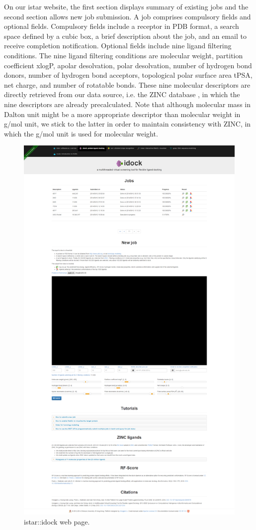 On our istar website, the first section displays summary of existing jobs and the second section allows new job submission. A job comprises compulsory fields and optional fields. Compulsory fields include a receptor in PDB format, a search space defined by a cubic box, a brief description about the job, and an email to receive completion notification. Optional fields include nine ligand filtering conditions. The nine ligand filtering conditions are molecular weight, partition coefficient xlogP, apolar desolvation, polar desolvation, number of hydrogen bond donors, number of hydrogen bond acceptors, topological polar surface area tPSA, net charge, and number of rotatable bonds. These nine molecular descriptors are directly retrieved from our data source, i.e. the ZINC database \citep{532,1178}, in which the nine descriptors are already precalculated. Note that although molecular mass in Dalton unit might be a more appropriate descriptor than molecular weight in g/mol unit, we stick to the latter in order to maintain consistency with ZINC, in which the g/mol unit is used for molecular weight.

\begin{figure}
\centering
\includegraphics[width=0.8\linewidth]{../istar/idock.png}
\caption{istar::idock web page.}
\label{istar:idock}
\end{figure}

